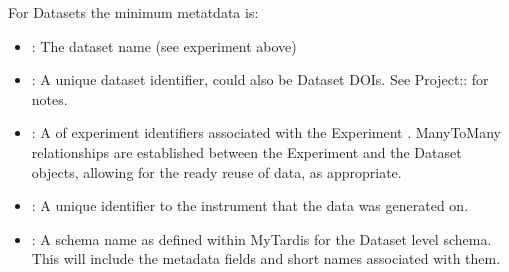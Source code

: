 \documentclass[letterpaper,10pt,english]{sphinxmanual}
\begin{document}
\sphinxAtStartPar
For Datasets the minimum metatdata is:
\begin{itemize}
\item {} 
\sphinxAtStartPar
{}: The dataset name (see experiment  above)

\item {} 
\sphinxAtStartPar
{}: A unique dataset identifier, could also be Dataset DOIs. See Project:: for notes.

\item {} 
\sphinxAtStartPar
{}: A  of experiment identifiers associated with the Experiment .  Many\sphinxhyphen{}To\sphinxhyphen{}Many relationships are established between the Experiment and the Dataset objects, allowing for the ready re\sphinxhyphen{}use of data, as appropriate.

\item {} 
\sphinxAtStartPar
{}: A unique identifier to the instrument that the data was generated on.

\item {} 
\sphinxAtStartPar
{}: A schema name as defined within MyTardis for the Dataset level schema. This will include the metadata fields and short names associated with them.

\end{itemize}
\end{document}

